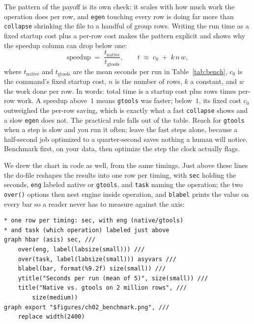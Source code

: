 \documentclass[
    a4paper,
    fontsize=10pt,
    twoside=true,
    numbers=noenddot,
]{kaobook}
\begin{document}
The pattern of the payoff is its own check: it scales with how much work the operation does per row, and \texttt{egen} touching every row is doing far more than \texttt{collapse} shrinking the file to a handful of group rows. Writing the run time as a fixed startup cost plus a per-row cost makes the pattern explicit and shows why the speedup column can drop below one:
\[
  \text{speedup} \;=\; \frac{t_{\text{native}}}{t_{\text{gtools}}},
  \qquad
  t \;\approx\; c_{0} \;+\; k\,n\,w,
\]
where $t_{\text{native}}$ and $t_{\text{gtools}}$ are the mean seconds per run in Table~\ref{tab:bench}, $c_{0}$ is the command's fixed startup cost, $n$ is the number of rows, $k$ a constant, and $w$ the work done per row. In words: total time is a startup cost plus rows times per-row work. A speedup above~$1$ means \texttt{gtools} was faster; below~$1$, its fixed cost $c_{0}$ outweighed the per-row saving, which is exactly what a fast \texttt{collapse} shows and a slow \texttt{egen} does not. The practical rule falls out of the table. Reach for \texttt{gtools} when a step is slow and you run it often; leave the fast steps alone, because a half-second job optimized to a quarter-second saves nothing a human will notice. Benchmark first, on your data, then optimize the step the clock actually flags.

We drew the chart in code as well, from the same timings. Just above these lines the do-file reshapes the results into one row per timing, with \texttt{sec} holding the seconds, \texttt{eng} labeled native or \texttt{gtools}, and \texttt{task} naming the operation; the two \texttt{over()} options then nest engine inside operation, and \texttt{blabel} prints the value on every bar so a reader never has to measure against the axis:
\par
{\footnotesize
\begin{verbatim}
* one row per timing: sec, with eng (native/gtools)
* and task (which operation) labeled just above
graph hbar (asis) sec, ///
    over(eng, label(labsize(small))) ///
    over(task, label(labsize(small))) asyvars ///
    blabel(bar, format(%9.2f) size(small)) ///
    ytitle("Seconds per run (mean of 5)", size(small)) ///
    title("Native vs. gtools on 2 million rows", ///
        size(medium))
graph export "$figures/ch02_benchmark.png", ///
    replace width(2400)
\end{verbatim}
}
\end{document}
